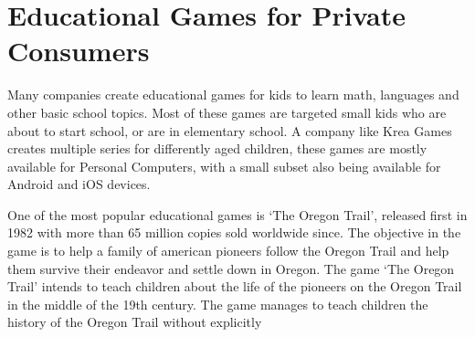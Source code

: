 \section{Educational Games for Private Consumers}
\label{sec:privateconsumers}
Many companies create educational games for kids to learn math, languages and other basic school topics. Most of these games are targeted small kids who are about to start school, or are in elementary school. A company like Krea Games\cite{kreagames} creates multiple series for differently aged children, these games are mostly available for Personal Computers, with a small subset also being available for Android and iOS devices.

One of the most popular educational games is `The Oregon Trail', released first in 1982 with more than 65 million copies sold worldwide since\cite{oregontrail}. The objective in the game is to help a family of american pioneers follow the Oregon Trail and help them survive their endeavor and settle down in Oregon.
The game `The Oregon Trail' intends to teach children about the life of the pioneers on the Oregon Trail in the middle of the 19th century. The game manages to teach children the history of the Oregon Trail without explicitly 